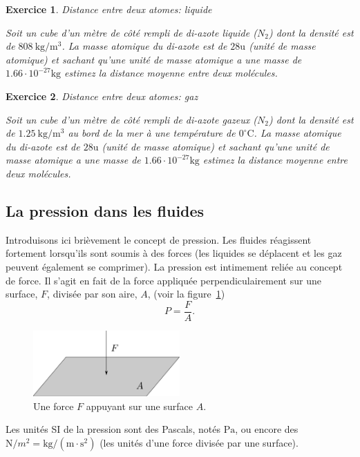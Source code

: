\documentclass[a4paper,12pt]{book}
\newtheorem{exercice}{Exercice}
\newcommand{\m}{\mathrm{m}}
\newcommand{\s}{\mathrm{s}}
\newcommand{\kg}{\mathrm{kg}}
\newcommand{\C}{\mathrm{C}}
\newcommand{\N}{\mathrm{N}}
\newcommand{\Pa}{\mathrm{Pa}}
\begin{document}
\begin{exercice}{Distance entre deux atomes: liquide}

Soit un cube d'un mètre de côté rempli de di-azote liquide ($N_2$) dont la densité est de 
$808\ \kg/\m^3$. La masse atomique du di-azote est de $28\mathrm{u}$ (unité de masse atomique) et 
sachant qu'une unité de masse atomique a une masse de $1.66\cdot 10^{-27}\kg$ estimez
la distance moyenne entre deux molécules.
\end{exercice}

\begin{exercice}{Distance entre deux atomes: gaz}

Soit un cube d'un mètre de côté rempli de di-azote gazeux ($N_2$) dont la densité est de 
$1.25\ \kg/\m^3$ au bord de la mer à une température de $0^\circ\C$. La masse atomique du di-azote est de $28\mathrm{u}$ (unité de masse atomique) et 
sachant qu'une unité de masse atomique a une masse de $1.66\cdot 10^{-27}\kg$ estimez
la distance moyenne entre deux molécules.
\end{exercice}

\subsection{La pression dans les fluides}

Introduisons ici brièvement le concept de pression. Les fluides
réagissent fortement lorsqu'ils sont soumis à des forces (les liquides se déplacent et les gaz peuvent également se comprimer). 
La pression est intimement reliée au concept de force. Il s'agit en fait de la force appliquée perpendiculairement sur une surface, $F$, divisée
par son aire, $A$, (voir la figure~\ref{fig_FA})
\begin{equation}
P=\frac{F}{A}.
\end{equation}
\begin{figure}
\begin{center}
\includegraphics[width=0.5\textwidth]{figs/pression.pdf}
\caption{Une force $F$ appuyant sur une surface $A$.}
\label{fig_FA}
\end{center}
\end{figure} 
Les unités SI de la pression sont des Pascals, 
notés $\Pa$, ou encore des $\N/m^2=\kg/(\m\cdot\s^2)$ (les unités d'une force divisée par une surface).
\end{document}
